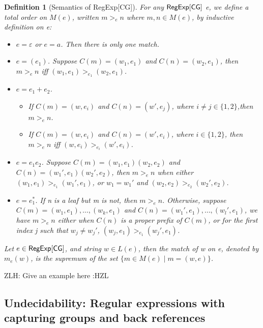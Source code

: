 \documentclass[sigplan,review,anonymous]{acmart}\settopmatter{printfolios=true,printccs=false,printacmref=false}
\newcommand{\zhilei}[1]{\color{green} {ZLH: #1 :HZL} \color{black}}
\newcommand{\zhilei}[1]{}
\newtheorem{definition}{Definition}
\begin{document}
\begin{definition}[Semantics of RegExp{[\sf CG]}]
  For any ${\sf RegExp}[\sf CG]$ e, we define a total order on $M (e)$, written $m
  >_e n$ where $m, n \in M (e)$, by inductive definition on e:
  \begin{itemize}
    \item $e = \varepsilon$ or $e = a$. Then there is only one match.
    
    \item $e = (e_1)$. Suppose $C (m) = (w_1, e_1)$ and $C (n) = (w_2, e_1)$,
    then $m >_e n$ iff $(w_1, e_1) >_{e_1} (w_2, e_1)$.
    
    \item $e = e_1 + e_2$.
    \begin{itemize}
      \item If $C (m) = (w, e_i)$ and $C (n) = (w', e_j)$, where $i \neq j \in
      \{ 1, 2 \}$,then $m >_e n$.
      
      \item If $C (m) = (w, e_i)$ and $C (n) = (w', e_i)$, where $i \in \{ 1,
      2 \}$, then $m >_e n$ iff $(w, e_i) >_{e_i} (w', e_i)$.
    \end{itemize}
    \item $e = e_1 e_2$. Suppose $C (m) = (w_1, e_1) (w_2, e_2)$ and $C (n) =
    (w_1', e_1) (w_2', e_2)$, then $m >_e n$ when either $(w_1, e_1) >_{e_1}
    (w_1', e_1)$, or $w_1 = w_1'$ and $(w_2, e_2) >_{e_2} (w_2', e_2)$.
    
    \item $e = e_1^{\ast}$. If n is a leaf but m is not, then $m >_e n$.
    Otherwise, suppose $C (m) = (w_1, e_1), \ldots, (w_k, e_1)$ and $C (n) =
    (w_1', e_1), \ldots, (w_l', e_1)$, we have $m >_e n$ either when $C (n)$
    is a proper prefix of $C (m)$, or for the first index j such that $w_j
    \neq w_j'$, $(w_j, e_1) >_{e_1} (w_j', e_1)$.
  \end{itemize}
  Let $e \in {\sf RegExp}[\sf CG]$, and string $w \in L (e)$, then the match of w
  on e, denoted by $m_e (w)$, is the supremum of the set $\{ m \in M (e) \mid m = (w, e) \}$.
\end{definition}

\zhilei{Give an example here}

\subsection{Undecidability: Regular expressions with capturing groups and back references}
\end{document}
